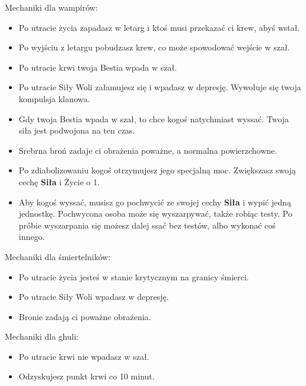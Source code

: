 	Mechaniki dla wampirów:
	\begin{itemize}
		\item Po utracie życia zapadasz w letarg i ktoś musi przekazać ci krew, abyś wstał.
		\item Po wyjściu z letargu pobudzasz krew, co może spowodować wejście w szał.
		\item Po utracie krwi twoja Bestia wpada w szał.
		\item Po utracie Siły Woli załamujesz się i wpadasz w depresję. Wywołuje się twoja kompulsja klanowa.
		\item Gdy twoja Bestia wpada w szał, to chce kogoś natychmiast wyssać. Twoja siła jest podwojona na ten czas.
		\item Srebrna broń zadaje ci obrażenia poważne, a normalna powierzchowne.
		\item Po zdiabolizowaniu kogoś otrzymujesz jego specjalną moc. Zwiększasz swoją cechę \textbf{Siła} i Życie o 1.
		\item Aby kogoś wyssać, musisz go pochwycić ze swojej cechy \textbf{Siła} i wypić jedną jednostkę. Pochwycona osoba może się wyszarpywać, także robiąc testy. Po próbie wyszarpania się możesz dalej ssać bez testów, albo wykonać coś innego.
	\end{itemize}

	Mechaniki dla śmiertelników:
	\begin{itemize}
		\item Po utracie życia jesteś w stanie krytycznym na granicy śmierci.
		\item Po utracie Siły Woli wpadasz w depresję.
		\item Bronie zadają ci poważne obrażenia.
	\end{itemize}

	Mechaniki dla ghuli:
	\begin{itemize}
		\item Po utracie krwi nie wpadasz w szał.
		\item Odzyskujesz punkt krwi co 10 minut.
	\end{itemize}

		
